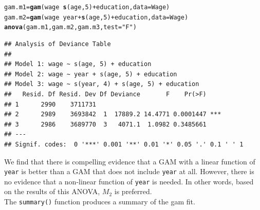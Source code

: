 \documentclass[12pt]{article}\usepackage[]{graphicx}\usepackage[]{color}
\makeatletter
\newcommand{\hlnum}[1]{\textcolor[rgb]{0.686,0.059,0.569}{#1}}%
\newcommand{\hlstr}[1]{\textcolor[rgb]{0.192,0.494,0.8}{#1}}%
\newcommand{\hlopt}[1]{\textcolor[rgb]{0,0,0}{#1}}%
\newcommand{\hlstd}[1]{\textcolor[rgb]{0.345,0.345,0.345}{#1}}%
\newcommand{\hlkwb}[1]{\textcolor[rgb]{0.69,0.353,0.396}{#1}}%
\newcommand{\hlkwc}[1]{\textcolor[rgb]{0.333,0.667,0.333}{#1}}%
\newcommand{\hlkwd}[1]{\textcolor[rgb]{0.737,0.353,0.396}{\textbf{#1}}}%
\newenvironment{kframe}{%
 \def\at@end@of@kframe{}%
 \ifinner\ifhmode%
  \def\at@end@of@kframe{\end{minipage}}%
  \begin{minipage}{\columnwidth}%
 \fi\fi%
 \def\FrameCommand##1{\hskip\@totalleftmargin \hskip-\fboxsep
 \colorbox{shadecolor}{##1}\hskip-\fboxsep
     \hskip-\linewidth \hskip-\@totalleftmargin \hskip\columnwidth}%
 \MakeFramed {\advance\hsize-\width
   \@totalleftmargin\z@ \linewidth\hsize
   \@setminipage}}%
 {\par\unskip\endMakeFramed%
 \at@end@of@kframe}
\newenvironment{knitrout}{}{} %
\makeatother
\begin{document}
\begin{knitrout}
\color{fgcolor}\begin{kframe}
\begin{alltt}
\hlstd{gam.m1}\hlkwb{=}\hlkwd{gam}\hlstd{(wage}\hlopt{~}\hlkwd{s}\hlstd{(age,}\hlnum{5}\hlstd{)}\hlopt{+}\hlstd{education,} \hlkwc{data}\hlstd{=Wage)}
\hlstd{gam.m2}\hlkwb{=}\hlkwd{gam}\hlstd{(wage}\hlopt{~}\hlstd{year}\hlopt{+}\hlkwd{s}\hlstd{(age,}\hlnum{5}\hlstd{)}\hlopt{+}\hlstd{education,} \hlkwc{data}\hlstd{=Wage)}
\hlkwd{anova}\hlstd{(gam.m1, gam.m2, gam.m3,} \hlkwc{test}\hlstd{=}\hlstr{"F"}\hlstd{)}
\end{alltt}
\begin{verbatim}
## Analysis of Deviance Table
## 
## Model 1: wage ~ s(age, 5) + education
## Model 2: wage ~ year + s(age, 5) + education
## Model 3: wage ~ s(year, 4) + s(age, 5) + education
##   Resid. Df Resid. Dev Df Deviance       F    Pr(>F)    
## 1      2990    3711731                                  
## 2      2989    3693842  1  17889.2 14.4771 0.0001447 ***
## 3      2986    3689770  3   4071.1  1.0982 0.3485661    
## ---
## Signif. codes:  0 '***' 0.001 '**' 0.01 '*' 0.05 '.' 0.1 ' ' 1
\end{verbatim}
\end{kframe}
\end{knitrout}

We find that there is compelling evidence that a GAM with a linear function of \texttt{year} is better than a GAM that does not include \texttt{year} at all. However, there is no evidence that a non-linear function of \texttt{year} is needed. In other words, based on the results of this ANOVA, $M_2$ is preferred.\\

The \texttt{summary()} function produces a summary of the gam fit.
\end{document}
